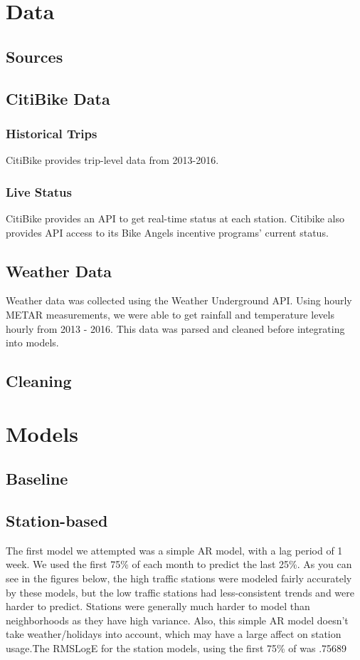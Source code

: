 \documentclass{proc}
\begin{document}
\section{Data}
\subsection{Sources}

\subsection{CitiBike Data}

\subsubsection{Historical Trips}
CitiBike provides trip-level data from 2013-2016.

\subsubsection{Live Status}
CitiBike provides an API to get real-time status at each station. Citibike also provides API access to its Bike Angels incentive programs' current status.

\subsection{Weather Data}

Weather data was collected using the Weather Underground API. Using hourly METAR measurements, we were able to get rainfall and temperature levels hourly from 2013 - 2016. This data was parsed and cleaned before integrating into models.



\subsection{Cleaning}


\section{Models}


\subsection{Baseline}

\subsection{Station-based}
The first model we attempted was a simple AR model, with a lag period of 1 week. We used the first 75\% of each month to predict the last 25\%. As you can see in the figures below, the high traffic stations were modeled fairly accurately by these models, but the low traffic stations had less-consistent trends and were harder to predict. Stations were generally much harder to model than neighborhoods as they have high variance. Also, this simple AR model doesn't take weather/holidays into account, which may have a large affect on station usage.The RMSLogE for the station models, using the first 75\% of  was .75689 
\end{document}
